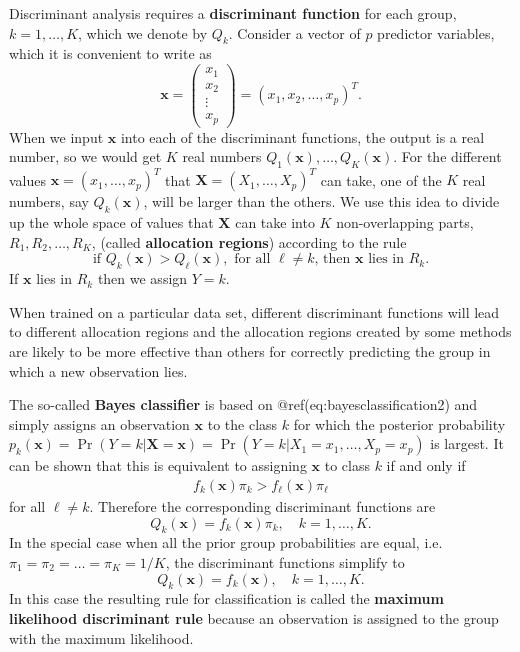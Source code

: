 \documentclass[
]{article}
\begin{document}
Discriminant analysis requires a \textbf{discriminant function} for each
group, \(k=1,\ldots,K\), which we denote by \(Q_k\). Consider a vector
of \(p\) predictor variables, which it is convenient to write as
\begin{equation*}
\boldsymbol{x} = 
\begin{pmatrix}
x_1\\
x_2\\
\vdots\\
x_p
\end{pmatrix} = (x_1, x_2, \ldots, x_p)^T.
\end{equation*} When we input \(\boldsymbol{x}\) into each of the
discriminant functions, the output is a real number, so we would get
\(K\) real numbers \(Q_1(\boldsymbol{x}), \ldots, Q_K(\boldsymbol{x})\).
For the different values \(\boldsymbol{x} = (x_1, \ldots, x_p)^T\) that
\(\boldsymbol{X} = (X_1, \ldots, X_p)^T\) can take, one of the \(K\)
real numbers, say \(Q_k(\boldsymbol{x})\), will be larger than the
others. We use this idea to divide up the whole space of values that
\(\boldsymbol{X}\) can take into \(K\) non-overlapping parts,
\(R_1,R_2,\ldots,R_K\), (called \textbf{allocation regions}) according
to the rule \begin{equation*}
\text{if } Q_k(\boldsymbol{x}) > Q_{\ell}(\boldsymbol{x}), \text{ for all $\ell \ne k$, then $\boldsymbol{x}$ lies in $R_k$}.
\end{equation*} If \(\boldsymbol{x}\) lies in \(R_k\) then we assign
\(Y = k\).

When trained on a particular data set, different discriminant functions
will lead to different allocation regions and the allocation regions
created by some methods are likely to be more effective than others for
correctly predicting the group in which a new observation lies.

The so-called \textbf{Bayes classifier} is based on
@ref(eq:bayesclassification2) and simply assigns an observation
\(\boldsymbol{x}\) to the class \(k\) for which the posterior
probability
\(p_k(\boldsymbol{x}) = \Pr(Y = k | \boldsymbol{X} = \boldsymbol{x}) = \Pr(Y = k | X_1 = x_1, \ldots, X_p = x_p)\)
is largest. It can be shown that this is equivalent to assigning
\(\boldsymbol{x}\) to class \(k\) if and only if \begin{align*}
f_k(\boldsymbol{x}) \pi_k > f_{\ell}(\boldsymbol{x}) \pi_{\ell}
\end{align*} for all \(\ell \ne k\). Therefore the corresponding
discriminant functions are \begin{equation*}
Q_k(\boldsymbol{x}) = f_k(\boldsymbol{x}) \pi_k, \quad k=1,\ldots,K.
\end{equation*} In the special case when all the prior group
probabilities are equal, i.e.~\(\pi_1 = \pi_2 = \ldots = \pi_K = 1/K\),
the discriminant functions simplify to \begin{equation*}
Q_k(\boldsymbol{x}) = f_k(\boldsymbol{x}), \quad k=1,\ldots,K.
\end{equation*} In this case the resulting rule for classification is
called the \textbf{maximum likelihood discriminant rule} because an
observation is assigned to the group with the maximum likelihood.
\end{document}
